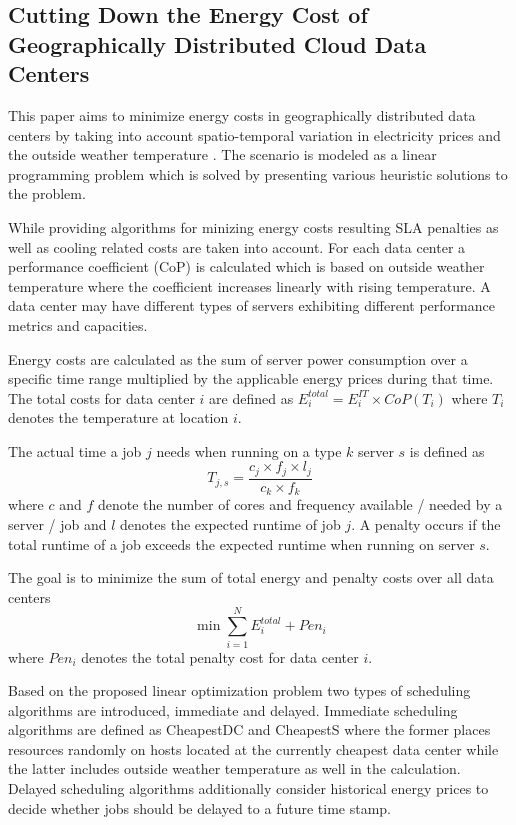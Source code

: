 \subsection{Cutting Down the Energy Cost of Geographically Distributed Cloud Data Centers}

This paper aims to minimize energy costs in geographically distributed data centers by taking into account spatio-temporal variation in electricity prices and the outside weather temperature \cite{guler2013cutting}. The scenario is modeled as a linear programming problem which is solved by presenting various heuristic solutions to the problem. 

While providing algorithms for minizing energy costs resulting SLA penalties as well as cooling related costs are taken into account. 
For each data center a performance coefficient (CoP) is calculated which is based on outside weather temperature where the coefficient increases linearly with rising temperature. A data center may have different types of servers exhibiting different performance metrics and capacities. 

Energy costs are calculated as the sum of server power consumption over a specific time range multiplied by the applicable energy prices during that time. 
The total costs for data center $i$ are defined as $E_{i}^{total} = E_{i}^{IT} \times CoP(T_i)$ where $T_i$ denotes the temperature at location $i$. 

The actual time a job $j$ needs when running on a type $k$ server $s$ is defined as 
\[  T_{j,s} = \frac{c_j \times f_j \times l_j}{c_k \times f_k}  \] 
where $c$ and $f$ denote the number of cores and frequency available / needed by a server / job and $l$ denotes the expected runtime of job $j$. 
A penalty occurs if the total runtime of a job exceeds the expected runtime when running on server $s$. 

The goal is to minimize the sum of total energy and penalty costs over all data centers 
\[ \min \sum_{i=1}^{N}{E_{i}^{total} + Pen_i} \]
where $Pen_i$ denotes the total penalty cost for data center $i$. 

Based on the proposed linear optimization problem two types of scheduling algorithms are introduced, immediate and delayed. Immediate scheduling algorithms are defined as CheapestDC and CheapestS where the former places resources randomly on hosts located at the currently cheapest data center while the latter includes outside weather temperature as well in the calculation. Delayed scheduling algorithms additionally consider historical energy prices to decide whether jobs should be delayed to a future time stamp. 


